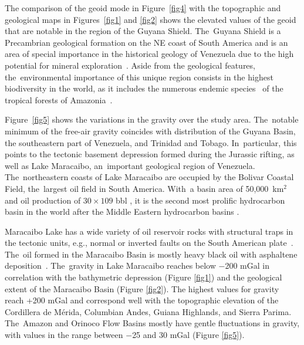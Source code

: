 \documentclass[sustainability,article,accept,pdftex,moreauthors]{Definitions/mdpi}
\begin{document}
{The comparison of the }geoid mode in Figure~\ref{fig4} with the topographic and geological maps in Figures~\ref{fig1} and \ref{fig2}{ shows }the elevated values of the geoid{ that }are notable in the region of the Guyana Shield. The~Guyana Shield is a Precambrian geological formation on the NE coast of  South America and {is }an area of special importance in the historical geology of Venezuela due to {the }high potential for mineral exploration~\cite{Gibbs}. {Aside from the geological features, the~}environmental importance of this unique region consists in the highest biodiversity in the world,{ as it includes the numerous }endemic species~\cite{Hollowell} {of }the tropical forests of Amazonia~\cite{Hammond}. 

Figure~\ref{fig5} shows the variations in the gravity over the study area. The~notable minimum of the free-air gravity  coincides %
 with distribution of the Guyana Basin, the {southeastern} part of  Venezuela,{ and }Trinidad and Tobago{. In~particular, this }points to the tectonic basement depression formed during {the }Jurassic rifting, {as well as }Lake Maracaibo, an~important geological region of Venezuela. The~{northeastern }coasts of  Lake Maracaibo are occupied by the Bolivar Coastal Field, the~largest oil field in South America{. With~a basin area of 50,000~km$^{2}$ and oil production of $30 \times 109$ bbl %
, it is }the second{ }most prolific hydrocarbon basin in the world after the Middle Eastern{ hydrocarbon basins }\cite{Escalona}.   

 Maracaibo Lake has a wide variety of oil reservoir rocks with structural traps in the tectonic units, e.g.{, }normal or inverted faults on the South American plate~\cite{Bockmeulen}. The~oil formed in the Maracaibo Basin is mostly heavy black oil with asphaltene deposition~\cite{Escobar,Memon}. The~gravity in  Lake Maracaibo reaches below $-$200 mGal in correlation with  the bathymetric depression (Figure \ref{fig1}) and the geological extent of the Maracaibo Basin (Figure \ref{fig2}).{ The }highest values for gravity reach +200 mGal and  correspond well with the topographic elevation of the Cordillera de Mérida, Columbian Andes, Guiana Highlands, and Sierra Parima. The~Amazon and Orinoco Flow Basins mostly have gentle fluctuations in gravity, with values in the range between $-$25 and 30 mGal (Figure \ref{fig5}).
\end{document}
